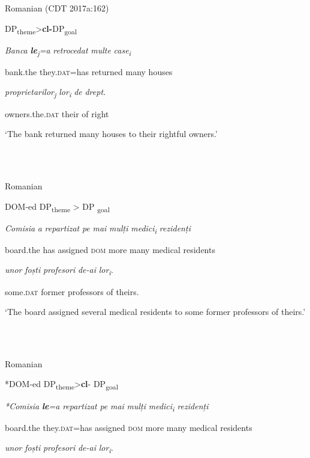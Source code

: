 \documentclass[output=paper,modfonts,nonflat]{langsci/langscibook}
\begin{document}
          Romanian (CDT 2017a:162)

DP\textsubscript{theme}>\textbf{cl-}DP\textsubscript{goal}

\textit{Banca}    \textbf{\textit{le}}\textit{\textsubscript{j}}\textit{=a}     \textit{retrocedat}    \textit{multe} \textit{case\textsubscript{i}}

bank.the  they.\textsc{dat}=has   returned     many houses  

\textit{proprietarilor\textsubscript{j}}    \textit{lor\textsubscript{i}  }\textit{de} \textit{drept.}

owners.the.\textsc{dat}  their   of right

‘The bank returned many houses to their rightful owners.’

\ea%
    \label{ex:key:3}
    \gll\\
        \\
    \glt
    \z

          Romanian

DOM-ed DP\textsubscript{theme} > DP \textsubscript{goal}

\textit{Comisia}  \textit{a} \textit{repartizat}  \textit{pe} \textit{mai}    \textit{mulți}   \textit{medici\textsubscript{i}    }\textit{rezidenți}  

board.the  has assigned  \textsc{dom} more many medical residents  

\textit{unor}    \textit{foști} \textit{profesori}    \textit{de-ai} \textit{lor\textsubscript{i}}.

some.\textsc{dat}  former professors   of theirs.

‘The board assigned several medical residents to some former professors of theirs.’

\ea%
    \label{ex:key:4}
    \gll\\
        \\
    \glt
    \z

          Romanian

*DOM-ed DP\textsubscript{theme}>\textbf{cl}{}- DP\textsubscript{goal}

\textit{*Comisia}  \textbf{\textit{le}}\textit{=a}   \textit{repartizat}  \textit{pe}  \textit{mai} \textit{mulți} \textit{medici\textsubscript{i}  }\textit{rezidenți}

board.the  they.\textsc{dat}=has assigned  \textsc{dom} more many medical residents   

\textit{unor}    \textit{foști}  \textit{profesori}  \textit{de-ai} \textit{lor\textsubscript{i}}.
\end{document}
